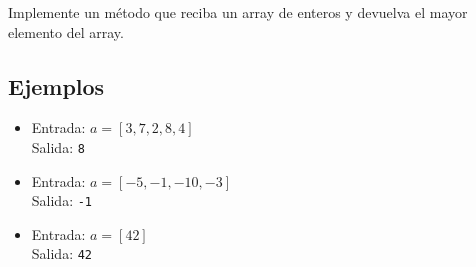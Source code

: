 Implemente un método que reciba un array de enteros y devuelva el mayor elemento del array.
\subsection*{Ejemplos}
\begin{itemize}
    \item Entrada: \( a = [3, 7, 2, 8, 4] \)\\
    Salida: \texttt{8}
    
    \item Entrada: \( a = [-5, -1, -10, -3] \)\\
    Salida: \texttt{-1}
    
    \item Entrada: \( a = [42] \)\\
    Salida: \texttt{42}
\end{itemize}